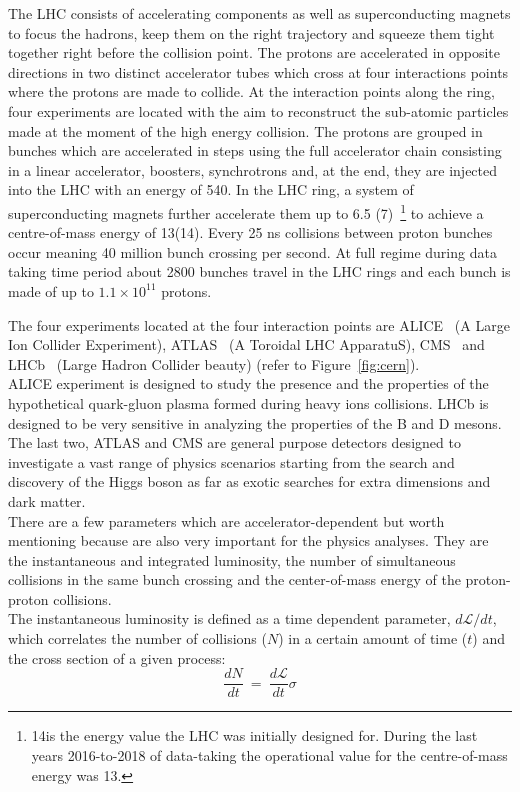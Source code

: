 The LHC consists of accelerating components as well as
superconducting magnets to focus the hadrons, keep them on the right
trajectory and squeeze them tight together right before the
collision point. 
The protons are accelerated in opposite directions in two distinct
accelerator tubes which cross at four interactions points where the
protons are made to collide. At the interaction points along the ring,
four experiments are located with the aim to reconstruct the
sub-atomic particles made at the moment of the high energy collision.
The protons are grouped in bunches which are
accelerated in steps using the full accelerator chain consisting in a linear
accelerator, boosters, synchrotrons and, at the end, they are injected
into the LHC with an energy of 540\GeV. In the LHC ring, a system of
superconducting magnets further accelerate them up to 6.5\TeV
(7\TeV)~\footnote{14\TeV is the energy value the LHC was initially designed for. During the last years
  2016-to-2018 of data-taking the operational value for the centre-of-mass energy was 13\TeV.}
to achieve a centre-of-mass energy of 13\TeV (14\TeV). Every
25 ns collisions between proton bunches occur meaning 40 million
bunch crossing per second. At full regime during data taking time
period about 2800 bunches travel in the LHC rings and each bunch is
made of up to $1.1\times10^{11}$ protons.

The four experiments located at the four interaction points are
ALICE~\cite{alice_2008} (A Large Ion Collider Experiment),
ATLAS~\cite{atlas_2008} (A Toroidal LHC ApparatuS),
CMS~\cite{cms_2008} and LHCb~\cite{lhcb_2008} (Large Hadron Collider
beauty) (refer to Figure~\ref{fig:cern}).\\
 ALICE experiment is designed
to study the presence and the properties of the hypothetical
quark-gluon plasma formed during heavy ions collisions. LHCb is
designed to be very sensitive in analyzing the properties of the B and D
mesons. The last two, ATLAS and CMS are general purpose detectors
designed to investigate a vast range of physics scenarios starting
from the search and discovery of the Higgs boson as far as exotic
searches for extra dimensions
and dark matter. \\

There are a few parameters which are accelerator-dependent but worth
mentioning because are also very important for the
physics analyses. They are the instantaneous and integrated luminosity, the
number of simultaneous collisions in the same bunch crossing and the
center-of-mass energy of the proton-proton collisions.\\
The instantaneous luminosity is defined as a time dependent
parameter, $d\mathcal{L}/dt$, which correlates the number of collisions
($N$) in a certain amount of time ($t$) and the cross section of a
given process:
\begin{equation}
\label{eq:instalumi}
\frac{dN}{dt} \: = \: \frac{d\mathcal{L}}{dt}\sigma
\end{equation}

